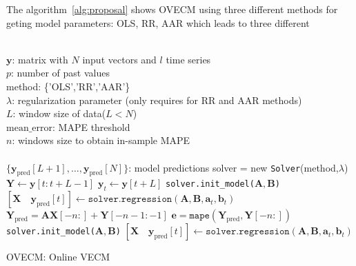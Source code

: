 \documentclass[twocolumn]{svjour3}          %
\begin{document}

The algorithm~\ref{alg:proposal} shows OVECM using three different
methods for geting model parameters: OLS, RR, AAR which leads to three different

\begin{algorithm}[ht]
\begin{algorithmic}[1]
\REQUIRE $\,$ \\
$\mathbf{y}$: matrix with $N$ input vectors and $l$ time series\\
$p$: number of past values \\
method: \{'OLS','RR','AAR'\} \\
$\lambda$: regularization parameter (only requires for RR and AAR methods) \\
$L$: window size of data($L<N$) \\
$\text{mean\_error}$: MAPE threshold \\
$n$: windows size to obtain in-sample MAPE \\
\ENSURE  $\,$ \\
$\{\mathbf{y}_{\text{pred}}[L+1],\dots, \mathbf{y}_{\text{pred}}[N]\}$: model predictions 
\STATE solver = new \texttt{Solver}(method,$\lambda$) \\
    \STATE $\mathbf{Y} \gets \mathbf{y}[t:t+L-1]$
    \STATE $\mathbf{y}_t \gets \mathbf{y}[t+L]$
        \STATE \texttt{solver.init\_model($\mathbf{A},\mathbf{B}$)} 
    \ENDIF
    \STATE $[\mathbf{X} \quad \mathbf{y}_{\text{pred}}[t]] \gets \texttt{solver.regression}
    (\mathbf{A},\mathbf{B},\mathbf{a}_t,\mathbf{b}_t)$
    \STATE $\mathbf{Y}_{\text{pred}} = \mathbf{AX}[-n:]+\mathbf{Y}[-n-1:-1]$
    \STATE $\mathbf{e} = \texttt{mape}(\mathbf{Y}_{\text{pred}},\mathbf{Y}[-n:])$
        \STATE \texttt{solver.init\_model($\mathbf{A},\mathbf{B}$)} 
        \STATE $[\mathbf{X} \quad \mathbf{y}_{\text{pred}}[t]] \gets \texttt{solver.regression}
        (\mathbf{A},\mathbf{B},\mathbf{a}_t,\mathbf{b}_t)$
    \ENDIF
{}
\ENDFOR
\end{algorithmic}
\caption{OVECM: Online VECM}
\label{alg:proposal}
\end{algorithm}
\end{document}

